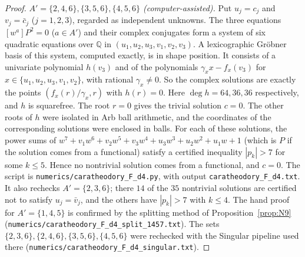 \documentclass[11pt]{amsart}
\theoremstyle{remark}
\begin{document}
\begin{proof}
\emph{$A'=\{2,4,6\},\{3,5,6\},\{4,5,6\}$ (computer-assisted).} Put $u_j=c_j$ and $v_j=\bar c_j$ ($j=1,2,3$), regarded as independent unknowns. The three
equations $[w^a]P^2=0$ ($a\in A'$) and their complex conjugates form a system of six quadratic equations over $\mathbb Q$ in $(u_1,u_2,u_3,v_1,v_2,v_3)$. A
lexicographic Gr\"obner basis of this system, computed exactly, is in shape position. It consists of a univariate polynomial $h(v_3)$ and of the polynomials
$\gamma_xx-f_x(v_3)$ for $x\in\{u_1,u_2,u_3,v_1,v_2\}$, with rational $\gamma_x\ne0$. So the complex solutions are exactly the points $(f_x(r)/\gamma_x,r)$ with $h(r)=0$.
Here $\deg h=64,36,36$ respectively, and $h$ is squarefree. The root $r=0$ gives the trivial solution $c=0$. The other roots of $h$ were isolated in Arb ball
arithmetic, and the coordinates of the corresponding solutions were enclosed in balls. For each of these solutions, the power sums of
$w^7+v_1w^6+v_2w^5+v_3w^4+u_3w^3+u_2w^2+u_1w+1$ (which is $P$ if the solution comes from a functional) satisfy a certified inequality $|p_k|>7$ for
some $k\le5$. Hence no nontrivial solution comes from a functional, and $c=0$. The script is \texttt{numerics/caratheodory\_F\_d4.py}, with output
\texttt{caratheodory\_F\_d4.txt}. It also rechecks $A'=\{2,3,6\}$; there $14$ of the $35$ nontrivial solutions are certified not to satisfy $u_j=\bar v_j$, and the others
have $|p_k|>7$ with $k\le4$. The hand proof for $A'=\{1,4,5\}$ is confirmed by the splitting method of Proposition~\ref{prop:N9}
(\texttt{numerics/caratheodory\_F\_d4\_split\_1457.txt}). The sets $\{2,3,6\},\{2,4,6\},\{3,5,6\},\{4,5,6\}$ were rechecked with the Singular
pipeline used there (\texttt{numerics/caratheodory\_F\_d4\_singular.txt}).
\end{proof}
\end{document}
